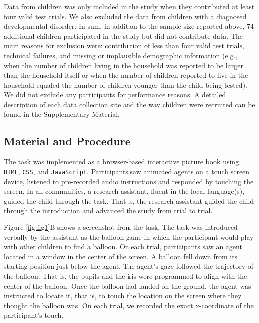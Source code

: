 \documentclass[
  man,floatsintext]{apa7}
\begin{document}
Data from children was only included in the study when they contributed at least four valid test trials. We also excluded the data from children with a diagnosed developmental disorder. In sum, in addition to the sample size reported above, 74 additional children participated in the study but did not contribute data. The main reasons for exclusion were: contribution of less than four valid test trials, technical failures, and missing or implausible demographic information (e.g., when the number of children living in the household was reported to be larger than the household itself or when the number of children reported to live in the household equaled the number of children younger than the child being tested). We did not exclude any participants for performance reasons. A detailed description of each data collection site and the way children were recruited can be found in the Supplementary Material.

\hypertarget{material-and-procedure}{%
\subsection{Material and Procedure}\label{material-and-procedure}}

The task was implemented as a browser-based interactive picture book using \texttt{HTML}, \texttt{CSS}, and \texttt{JavaScript}. Participants saw animated agents on a touch screen device, listened to pre-recorded audio instructions and responded by touching the screen. In all communities, a research assistant, fluent in the local language(s), guided the child through the task. That is, the research assistant guided the child through the introduction and advanced the study from trial to trial.

Figure \ref{fig:fig1}B shows a screenshot from the task. The task was introduced verbally by the assistant as the balloon game in which the participant would play with other children to find a balloon. On each trial, participants saw an agent located in a window in the center of the screen. A balloon fell down from its starting position just below the agent. The agent's gaze followed the trajectory of the balloon. That is, the pupils and the iris were programmed to align with the center of the balloon. Once the balloon had landed on the ground, the agent was instructed to locate it, that is, to touch the location on the screen where they thought the balloon was. On each trial, we recorded the exact x-coordinate of the participant's touch.
\end{document}
